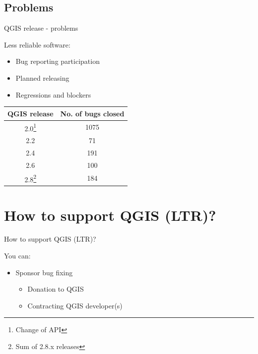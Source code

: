 \subsection{Problems}
\begin{frame}{QGIS release - problems}
	\begin{block}{Less reliable software:}
		\begin{itemize}
			\item Bug reporting participation
			\item Planned releasing 
			\item Regressions and blockers
		\end{itemize}
	\end{block}
	\begin{center}
		
		\begin{tabular}{|c|c|}
			\hline QGIS release & No. of bugs closed \\ 
			\hline 2.0\footnote{Change of API} & 1075 \\ 
			\hline 2.2 & 71 \\ 
			\hline 2.4 & 191 \\ 
			\hline 2.6 & 100 \\ 
			\hline 2.8\footnote{Sum of 2.8.x releases} & 184 \\ 
			\hline 
		\end{tabular}
	\end{center} 
\end{frame}






\section{How to support QGIS (LTR)?}

\begin{frame}{How to support QGIS (LTR)?}
	\begin{block}{You can:}
		\begin{itemize}
			\item Sponsor bug fixing
				\begin{itemize}
					\item Donation to QGIS
					\item Contracting QGIS developer(s)
				\end{itemize}
		\end{itemize}
	\end{block}
\end{frame}

